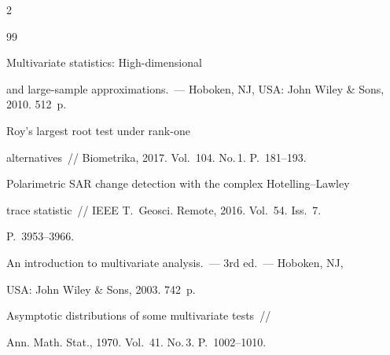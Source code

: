 \begin{multicols}{2}
{\small\frenchspacing


{%




\begin{thebibliography}{99}









  Multivariate statistics: High-dimensional 


and large-sample approximations.~--- Hoboken, NJ, USA: John Wiley \& Sons, 2010. 512~p.







 Roy's largest root test under rank-one 


alternatives~// Biometrika, 2017. Vol.~104. No.\,1. P.~181--193.









Polarimetric SAR change detection with the complex Hotelling--Lawley 


trace statistic~// IEEE T.~Geosci. Remote,  2016. Vol.~54. Iss.~7. 


P.~3953--3966.







  An introduction to multivariate analysis.~--- 3rd ed.~--- Hoboken, NJ,


USA: John Wiley \& Sons,  2003. 742~p.







  Asymptotic distributions of some multivariate tests~// 


Ann. Math. Stat., 1970. Vol.~41. No.\,3. P.~1002--1010.








\end{thebibliography}}}
\end{multicols}
